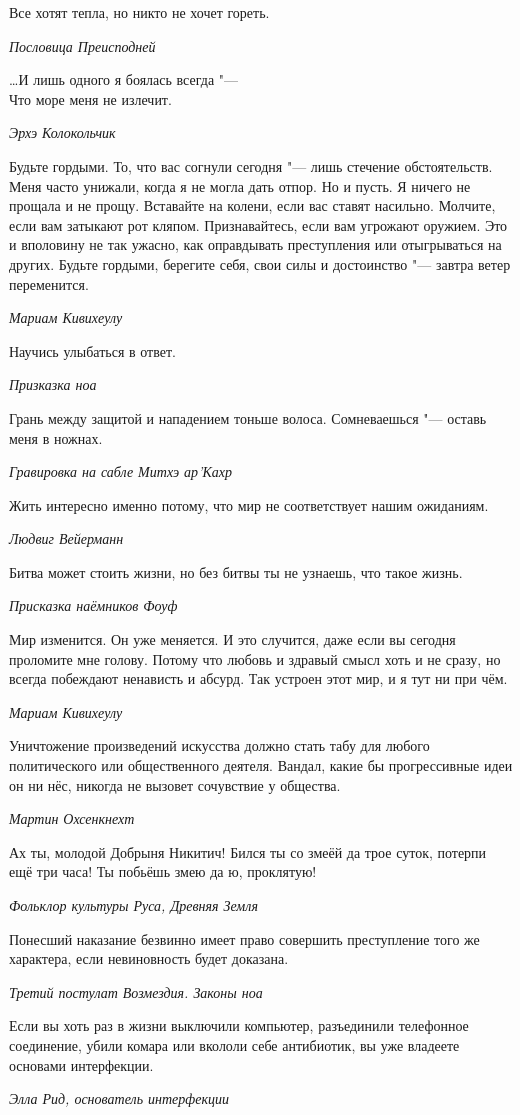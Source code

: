 \documentclass[a4paper,10pt]{book}
\newcommand{\mulang}[3]{#2}%
\begin{document}
\epigraph{Все хотят тепла, но никто не хочет гореть.}
{\textit{Пословица Преисподней}}

\epigraph{\dots И лишь одного я боялась всегда "---\\
Что море меня не излечит.}
{\textit{Эрхэ Колокольчик}}

\epigraph{Будьте гордыми.
То, что вас согнули сегодня "--- лишь стечение обстоятельств.
Меня часто унижали, когда я не могла дать отпор.
Но и пусть.
Я ничего не прощала и не прощу.
Вставайте на колени, если вас ставят насильно.
Молчите, если вам затыкают рот кляпом.
Признавайтесь, если вам угрожают оружием.
Это и вполовину не так ужасно, как оправдывать преступления или отыгрываться на других.
Будьте гордыми, берегите себя, свои силы и достоинство "--- завтра ветер переменится.}
{\textit{Мариам Кивихеулу}}

\epigraph{Научись улыбаться в ответ.}
{\textit{Призказка ноа}}

\epigraph{Грань между защитой и нападением тоньше волоса.
Сомневаешься "--- оставь меня в ножнах.}
{\textit{Гравировка на сабле Митхэ ар'Кахр}}

\epigraph{Жить интересно именно потому, что мир не соответствует нашим ожиданиям.}
{\textit{Людвиг Вейерманн}}

\epigraph{\mulang{}{Битва может стоить жизни, но без битвы ты не узнаешь, что такое жизнь.}
{Battle may take your life, but escaping battle you'll never know what life is.}}
{\textit{Присказка наёмников Фоуф}}

\epigraph{Мир изменится.
Он уже меняется.
И это случится, даже если вы сегодня проломите мне голову.
Потому что любовь и здравый смысл хоть и не сразу, но всегда побеждают ненависть и абсурд.
Так устроен этот мир, и я тут ни при чём.}
{\textit{Мариам Кивихеулу}}

\epigraph{Уничтожение произведений искусства должно стать табу для любого политического или общественного деятеля.
Вандал, какие бы прогрессивные идеи он ни нёс, никогда не вызовет сочувствие у общества.}
{\textit{Мартин Охсенкнехт}}

\epigraph{Ах ты, молодой Добрыня Никитич!
Бился ты со змеёй да трое суток, потерпи ещё три часа!
Ты побьёшь змею да ю, проклятую!}
{\textit{Фольклор культуры Руса, Древняя Земля}}

\epigraph{Понесший наказание безвинно имеет право совершить преступление того же характера, если невиновность будет доказана.}
{\textit{Третий постулат Возмездия. Законы ноа}}

\epigraph{Если вы хоть раз в жизни выключили компьютер, разъединили телефонное соединение, убили комара или вкололи себе антибиотик, вы уже владеете основами интерфекции.}
{\textit{Элла Рид, основатель интерфекции}}
\end{document}
